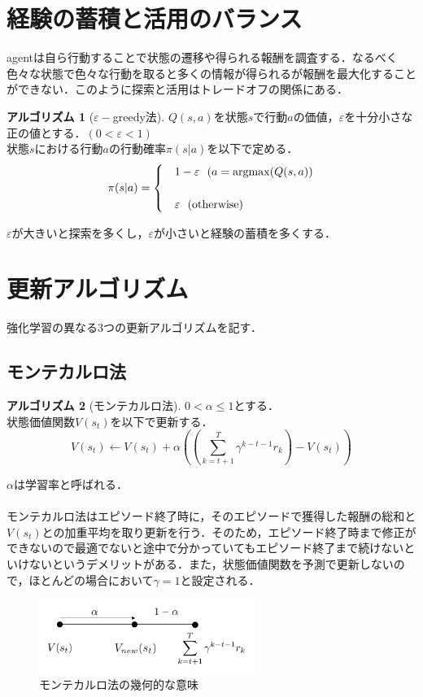\documentclass[a4paper,12pt]{jsreport}
\theoremstyle{definition}
\newtheorem{algorithm}{アルゴリズム}
\begin{document}
\section{経験の蓄積と活用のバランス}
agentは自ら行動することで状態の遷移や得られる報酬を調査する．なるべく色々な状態で色々な行動を取ると多くの情報が得られるが報酬を最大化することができない．このように探索と活用はトレードオフの関係にある．\newpage
\begin{algorithm}[$\varepsilon-$greedy法]
    $Q(s,a)$を状態$s$で行動$a$の価値，$\varepsilon$を十分小さな正の値とする．$(0<\varepsilon<1)$\\
    状態$s$における行動$a$の行動確率$\pi(s|a)$を以下で定める．
    \begin{eqnarray}
        \pi(s|a)=
            \begin{cases}
                & 1-\varepsilon \ \ (a={\rm argmax}(Q(s,a))\\ \\
                & \varepsilon \ \ ({\rm otherwise})
            \end{cases}
    \end{eqnarray}
\end{algorithm}
$\varepsilon$が大きいと探索を多くし，$\varepsilon$が小さいと経験の蓄積を多くする．
\section{更新アルゴリズム}
強化学習の異なる3つの更新アルゴリズムを記す．
\subsection{モンテカルロ法}
\begin{algorithm}[モンテカルロ法]
    $0<\alpha\leq1$とする．\\
    状態価値関数$V(s_t)$を以下で更新する．
    \begin{equation}
        V(s_t)\leftarrow V(s_t)+\alpha
        \left(\left(\sum_{k=t+1}^T\gamma^{k-t-1}r_k\right)-V(s_t)\right)
    \end{equation}
\end{algorithm}
$\alpha$は学習率と呼ばれる．\\
\\
モンテカルロ法はエピソード終了時に，そのエピソードで獲得した報酬の総和と$V(s_t)$との加重平均を取り更新を行う．そのため，エピソード終了時まで修正ができないので最適でないと途中で分かっていてもエピソード終了まで続けないといけないというデメリットがある．また，状態価値関数を予測で更新しないので，ほとんどの場合において$\gamma=1$と設定される．
\begin{figure}[h]
    \centering
    \includegraphics[width=7cm]{monte.png}
    \caption{モンテカルロ法の幾何的な意味}
    \label{fig:monte}
\end{figure}
\newpage
\end{document}
